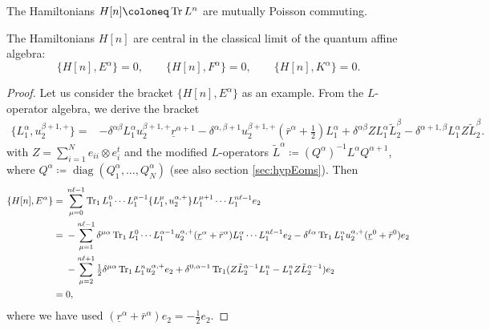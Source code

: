 \begin{corollary}
    The Hamiltonians $H[n] \coloneq \Tr L^n$ are mutually Poisson commuting.
\end{corollary}

\begin{prop}
    The Hamiltonians $H[n]$ are central in the classical limit of the quantum affine algebra:
    \begin{equation}
        \{ H[n], E^\alpha \} = 0, \qquad \{ H[n], F^\alpha \} = 0, \qquad \{ H[n], K^\alpha \} = 0.
    \end{equation}
\end{prop}

\begin{proof}
    Let us consider the bracket $\{ H[n],E^\alpha \}$ as an example. From the $L$-operator algebra, we derive the bracket
    \begin{equation*}
        \begin{aligned}
            \{ L_1^\alpha,u_2^{\beta+1,+} \}
            ={}& {-\delta^{\alpha\beta}} L_1^\alpha u_2^{\beta+1,+} \underline r^{\alpha+1} - \delta^{\alpha,\beta+1} u_2^{\beta+1,+} (\bar r^\alpha+\tfrac{1}{2}) L_1^\alpha + \delta^{\alpha\beta} Z L_1^\alpha \tilde L_2^\beta - \delta^{\alpha+1,\beta} L_1^\alpha Z \tilde L_2^\beta.
        \end{aligned}
    \end{equation*}
    with $Z = \sum_{i=1}^N e_{ii} \otimes e_i^t$ and the modified $L$-operators $\tilde L^\alpha \coloneq (Q^\alpha)^{-1} L^\alpha Q^{\alpha+1}$, where $Q^\alpha \coloneq \operatorname{diag}(Q_1^\alpha,\dots,Q_N^\alpha)$ (see also section \ref{sec:hypEoms}). Then
    \begin{equation*}
        \begin{aligned}
            \{ H[n],E^\alpha \}
            ={}& \sum_{\mu=0}^{n\ell-1} \operatorname{Tr}_1 L_1^0 \cdots L_1^{\mu-1} \{ L_1^\mu, u_2^{\alpha,+} \} L_1^{\mu+1} \cdots L_1^{n\ell-1} e_2 \\
            ={}& -\sum_{\mu=1}^{n\ell-1} \delta^{\mu\alpha} \operatorname{Tr}_1 L_1^0 \cdots L_1^{\alpha-1} u_2^{\alpha,+} (\underline r^{\alpha} + \bar r^\alpha) L_1^{\alpha} \cdots L_1^{n\ell-1} e_2 - \delta^{\ell\alpha} \operatorname{Tr}_1 L_1^n u_2^{\alpha,+} (\underline r^{0}+\bar r^0) e_2 \\
            &- \sum_{\mu=2}^{n\ell+1} \tfrac{1}{2} \delta^{\mu\alpha} \operatorname{Tr}_1 L_1^n u_2^{\alpha,+} e_2 + \delta^{0,\alpha-1} \operatorname{Tr}_1 (Z \tilde L_2^{\alpha-1} L_1^n-L_1^n Z \tilde L_2^{\alpha-1}) e_2 \\
            ={}& 0,
        \end{aligned}
    \end{equation*}
    where we have used $(\underline r^\alpha + \bar r^\alpha) e_2 = -\tfrac{1}{2} e_2$.
\end{proof}

